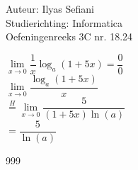 \documentclass[a4paper]{article}
\newcommand{\llim}{\lim\limits}
\begin{document}
\noindent \large Auteur: Ilyas Sefiani \\
\noindent \large Studierichting: Informatica\\
\noindent \large Oefeningenreeks 3C nr. 18.24\\

\medskip

\normalsize

$\llim_{x \rightarrow 0} \dfrac{1}{x}\log_a(1+5x) = \dfrac{0}{0}$\\

$\llim_{x \rightarrow 0} \dfrac{\log_a(1+5x)}{x}$\\

$\overset{H}{=}\llim_{x \rightarrow 0} \dfrac{5}{(1+5x)\ln(a)}$\\

$=\dfrac{5}{\ln(a)}$\\


\begin{thebibliography}{999}
\end{thebibliography}
\end{document}
